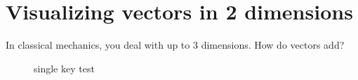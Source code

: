 \documentclass[a4paper,11pt,twoside]{report}
\begin{document}
\section{Visualizing vectors in 2 dimensions}%
\label{sec:visualizing_vectors_in_2_dimensions}

In classical mechanics, you deal with up to 3 dimensions. How do vectors add?

\begin{figure}[ht]
    \centering
    \caption{single key test}
    \label{fig:single-key-test}
\end{figure}

\newpage
\end{document}

